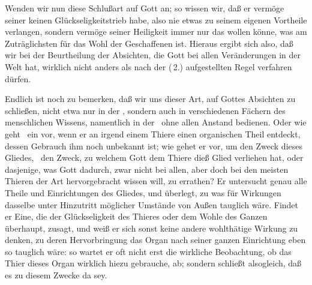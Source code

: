 \begin{aufza}
\item Wenden wir nun diese Schlußart auf Gott an; so wissen wir, daß er vermöge seiner  keinen Glückseligkeitstrieb habe, also nie etwas zu seinem eigenen Vortheile verlangen, sondern vermöge seiner Heiligkeit immer nur das wollen könne, was am Zuträglichsten für das Wohl der Geschaffenen ist. Hieraus ergibt sich also, daß wir bei der Beurtheilung der Absichten, die Gott bei allen Veränderungen in der Welt hat, wirklich nicht anders als nach der (\no\,2.) aufgestellten Regel verfahren dürfen.
\item Endlich ist noch zu bemerken, daß wir uns dieser Art, auf Gottes Absichten zu schließen, nicht etwa nur in der , sondern auch in verschiedenen  Fächern des menschlichen Wissens, namentlich in der  \udgl\  ohne allen Anstand bedienen. Oder wie geht \zB\ ein  vor, wenn er an irgend einem Thiere einen organischen Theil entdeckt, dessen Gebrauch ihm noch unbekannt ist; wie gehet er vor, um den Zweck dieses Gliedes, \dh\ den Zweck, zu welchem Gott dem Thiere dieß Glied verliehen hat, oder dasjenige, was Gott dadurch, zwar nicht bei allen, aber doch bei den meisten Thieren der Art hervorgebracht wissen will, zu errathen? Er untersucht genau alle Theile und Einrichtungen des Gliedes, und überlegt, zu was für Wirkungen dasselbe unter Hinzutritt möglicher Umstände von Außen tauglich wäre. Findet er Eine, die der Glückseligkeit des Thieres oder dem Wohle des Ganzen überhaupt, zusagt, und weiß er sich sonst keine andere wohlthätige Wirkung zu denken, zu deren Hervorbringung das Organ nach seiner ganzen Einrichtung eben so tauglich wäre: so wartet er oft nicht erst die wirkliche Beobachtung, ob das Thier dieses Organ wirklich hiezu gebrauche, ab; sondern schließt alsogleich, daß es zu diesem Zwecke da sey.
\end{aufza}

